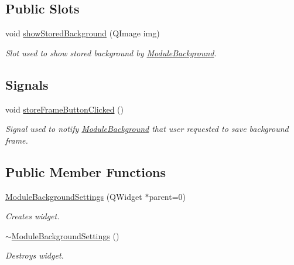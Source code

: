 \subsection*{Public Slots}
\begin{DoxyCompactItemize}
\item 
void \hyperlink{class_module_background_settings_a5b0fdd469604d4d1f60008806e1e19ce}{showStoredBackground} (QImage img)
\begin{DoxyCompactList}\small\item\em Slot used to show stored background by \hyperlink{class_module_background}{ModuleBackground}. \item\end{DoxyCompactList}\end{DoxyCompactItemize}
\subsection*{Signals}
\begin{DoxyCompactItemize}
\item 
\hypertarget{class_module_background_settings_aeba98bee4a76ee1007ff3e48a6079e19}{
void \hyperlink{class_module_background_settings_aeba98bee4a76ee1007ff3e48a6079e19}{storeFrameButtonClicked} ()}
\label{d7/deb/class_module_background_settings_aeba98bee4a76ee1007ff3e48a6079e19}

\begin{DoxyCompactList}\small\item\em Signal used to notify \hyperlink{class_module_background}{ModuleBackground} that user requested to save background frame. \item\end{DoxyCompactList}\end{DoxyCompactItemize}
\subsection*{Public Member Functions}
\begin{DoxyCompactItemize}
\item 
\hyperlink{class_module_background_settings_a4d10af27767dd4f64260550b4c9ec4d3}{ModuleBackgroundSettings} (QWidget $\ast$parent=0)
\begin{DoxyCompactList}\small\item\em Creates widget. \item\end{DoxyCompactList}\item 
\hypertarget{class_module_background_settings_af80d0ae8ae60b6904c1fa4882a171f6a}{
\hyperlink{class_module_background_settings_af80d0ae8ae60b6904c1fa4882a171f6a}{$\sim$ModuleBackgroundSettings} ()}
\label{d7/deb/class_module_background_settings_af80d0ae8ae60b6904c1fa4882a171f6a}

\begin{DoxyCompactList}\small\item\em Destroys widget. \item\end{DoxyCompactList}\end{DoxyCompactItemize}


